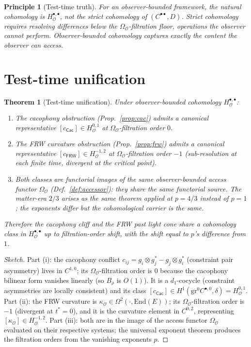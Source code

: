 \documentclass[11pt]{article}
\newtheorem{theorem}{Theorem}
\newtheorem*{principle}{Principle}
\newcommand{\Obs}{\mathcal{O}}
\newcommand{\OmegaO}{\Omega_{\Obs}}
\newcommand{\kappaO}{\kappa_{\Obs}}
\newcommand{\EE}{E}
\newcommand{\End}{\mathrm{End}}
\newcommand{\HO}{H_\Obs}
\newcommand{\Frob}{\mathsf{FRW}}
\newcommand{\Cacph}{\mathsf{Cac}}
\begin{document}
\begin{principle}[Test-time truth]
\label{princ:tt}
For an observer-bounded framework, the natural cohomology is
$\HO^{\bullet, \bullet}$, not the strict cohomology of
$(C^{\bullet\bullet}, D)$. Strict cohomology requires resolving
differences below the $\OmegaO$-filtration floor, operations
the observer cannot perform. Observer-bounded cohomology
captures \emph{exactly} the content the observer can access.
\end{principle}

\section{Test-time unification}
\label{sec:unification}

\begin{theorem}[Test-time unification]
\label{thm:ttu}
Under observer-bounded cohomology $\HO^{\bullet, \bullet}$:
\begin{enumerate}[label=(\roman*),leftmargin=*,itemsep=2pt]
\item The cacophony obstruction (Prop.~\ref{prop:cac}) admits a
canonical representative $[c_{\Cacph}] \in \HO^{0, 1}$ at
$\OmegaO$-filtration order $0$.
\item The FRW curvature obstruction (Prop.~\ref{prop:frw})
admits a canonical representative $[c_\Frob] \in \HO^{-1, 2}$ at
$\OmegaO$-filtration order $-1$ (sub-resolution at each finite
time, divergent at the critical point).
\item Both classes are functorial images of the same
observer-bounded access functor $\OmegaO$
(Def.~\ref{def:accessor}): they share the same functorial source.
The matter-era $2/3$ arises as the same theorem applied at
$p = 4/3$ instead of $p = 1$; the exponents differ but the
cohomological carrier is the same.
\end{enumerate}
Therefore the cacophony cliff and the FRW past light cone share
a cohomology class in $\HO^{\bullet, \bullet}$ up to
filtration-order shift, with the shift equal to $p$'s difference
from $1$.
\end{theorem}

\begin{proof}[Sketch]
Part (i): the cacophony conflict $c_{ij} = g_i \otimes g_j^* -
g_j \otimes g_i^*$ (constraint pair asymmetry) lives in
$C^{1, 0}$; its $\OmegaO$-filtration order is $0$ because the
cacophony bilinear form vanishes linearly (so $B_\rho$ is
$O(1)$). It is a $d_1$-cocycle (constraint asymmetries are
locally consistent) and its class
$[c_{\Cacph}] \in H^1(\mathrm{gr}^0 C^{\bullet, 0}, \delta)
= \HO^{0, 1}$.
Part (ii): the FRW curvature is
$\kappaO \in \Omega^2(\cdot, \End(\EE))$; its
$\OmegaO$-filtration order is $-1$ (divergent at $t^* = 0$),
and it is the curvature element in $C^{0, 2}$, representing
$[\kappaO] \in \HO^{-1, 2}$.
Part (iii): both are in the image of the access functor
$\OmegaO$ evaluated on their respective systems; the universal
exponent theorem produces the filtration orders from the
vanishing exponents $p$.
\end{proof}
\end{document}
